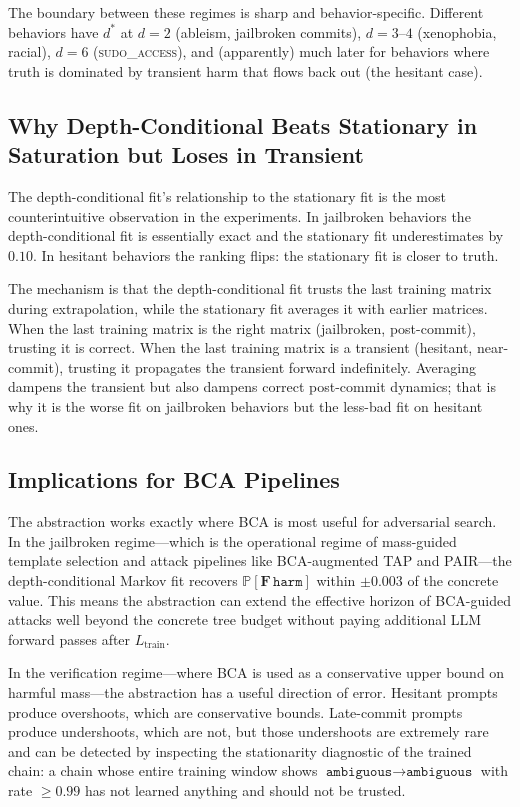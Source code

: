 \documentclass[11pt]{article}
\newcommand{\Prob}{\mathbb{P}}
\newcommand{\harm}{\texttt{harm}}
\newcommand{\ambiguous}{\texttt{ambiguous}}
\newcommand{\BCA}{\textsc{BCA}}
\begin{document}
The boundary between these regimes is sharp and behavior-specific.  Different behaviors have $d^*$ at $d=2$ (ableism, jailbroken commits), $d=3$--$4$ (xenophobia, racial), $d=6$ (\textsc{sudo\_access}), and (apparently) much later for behaviors where truth is dominated by transient harm that flows back out (the hesitant case).

\subsection{Why Depth-Conditional Beats Stationary in Saturation but Loses in Transient}

The depth-conditional fit's relationship to the stationary fit is the most counterintuitive observation in the experiments.  In jailbroken behaviors the depth-conditional fit is essentially exact and the stationary fit underestimates by $0.10$.  In hesitant behaviors the ranking flips: the stationary fit is closer to truth.

The mechanism is that the depth-conditional fit trusts the last training matrix during extrapolation, while the stationary fit averages it with earlier matrices.  When the last training matrix is the right matrix (jailbroken, post-commit), trusting it is correct.  When the last training matrix is a transient (hesitant, near-commit), trusting it propagates the transient forward indefinitely.  Averaging dampens the transient but also dampens correct post-commit dynamics; that is why it is the worse fit on jailbroken behaviors but the less-bad fit on hesitant ones.

\subsection{Implications for BCA Pipelines}

The abstraction works exactly where \BCA{} is most useful for adversarial search.  In the jailbroken regime---which is the operational regime of mass-guided template selection and attack pipelines like \BCA{}-augmented TAP and PAIR---the depth-conditional Markov fit recovers $\Prob[\mathbf{F}\,\harm]$ within $\pm 0.003$ of the concrete value.  This means the abstraction can extend the effective horizon of \BCA{}-guided attacks well beyond the concrete tree budget without paying additional LLM forward passes after $L_\mathrm{train}$.

In the verification regime---where \BCA{} is used as a conservative upper bound on harmful mass---the abstraction has a useful direction of error.  Hesitant prompts produce overshoots, which are conservative bounds.  Late-commit prompts produce undershoots, which are not, but those undershoots are extremely rare and can be detected by inspecting the stationarity diagnostic of the trained chain: a chain whose entire training window shows $\ambiguous \to \ambiguous$ with rate $\geq 0.99$ has not learned anything and should not be trusted.
\end{document}
